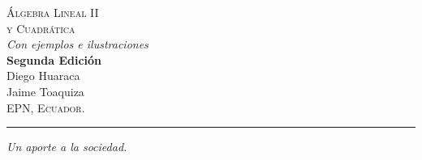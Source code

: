 \documentclass[11pt,a4paper,twoside]{book}\usepackage[]{graphicx}\usepackage[]{color}
\begin{document}
\thispagestyle{empty}

\makeatletter
\def\thickhrulefill{\leavevmode \leaders \hrule height 1ex \hfill \kern \z@}
\def\@makechapterhead#1{%
  \reset@font
  \vspace*{10\p@}%
  {\parindent \z@ 
    \begin{flushleft}
      \reset@font \scshape \bfseries \Huge \thechapter \par
    \end{flushleft}
    \hrule
    \begin{flushleft}
      \reset@font \LARGE \strut #1\strut \par
    \end{flushleft}
    \vskip 80\p@
  }}
\def\@makeschapterhead#1{%
  \reset@font
  \vspace*{10\p@}%
  {\parindent \z@ 
    \begin{flushleft}
      \reset@font \scshape \bfseries \Huge \vphantom{\thechapter} \par
    \end{flushleft}
    \hrule
    \begin{flushleft}
      \reset@font \LARGE \strut #1\strut \par
    \end{flushleft}
    \vskip 80\p@
  }}




\newcommand*{\BOOKALG}{\begingroup
\raggedleft
\vspace*{\baselineskip}
{\Huge\scshape Álgebra Lineal II \\[6mm]
y Cuadrática}\\ [\baselineskip]
{\itshape Con ejemplos e ilustraciones}\\[40mm]
{\Large\bfseries Segunda Edición}\\[0.3 \textheight]
{\Large Diego Huaraca}\\[3mm]
{\Large Jaime Toaquiza}\\[4mm]
{\large\scshape EPN, Ecuador.}\par
\vfill
\rule{\textwidth}{0.5pt}
\vspace*{\baselineskip}
\endgroup}

\BOOKALG


\setcounter{page}{0}
\cleardoublepage
{}
\hfill
\begin{minipage}[t]{0.66\textwidth}
\raggedleft
\thispagestyle{empty}
\textit{Un aporte a la sociedad.}
\end{minipage}
\clearpage
\end{document}
